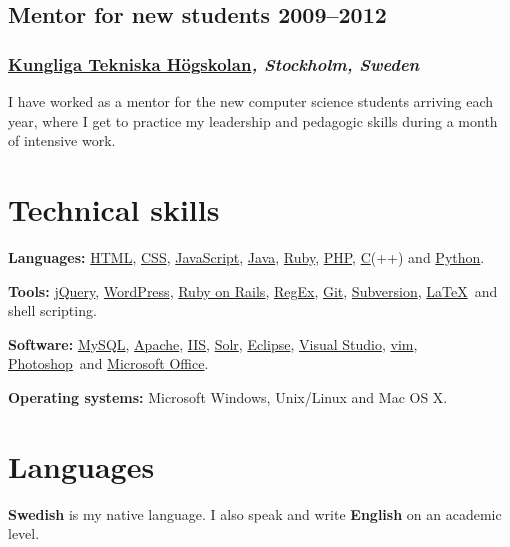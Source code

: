 \documentclass[a4paper,11pt]{article}
\newcommand{\thework}[2]{
  \subsection*{\textbf{#1} \hfill \textbf{#2}}\par%
}
\newcommand{\theplace}[2][]{%
  \subsubsection*{\textbf{#2}\textsl{#1}}%
}
\newcommand{\runin}[1]{%
  \vspace{2mm}
  \hspace{0mm}%
  {\normalsize \bfseries #1}%
}
\def\html{\href{http://en.wikipedia.org/wiki/HTML}{HTML}}
\def\javascript{\href{http://en.wikipedia.org/wiki/JavaScript}{JavaScript}}
\def\css{\href{http://en.wikipedia.org/wiki/Cascading_Style_Sheets}{CSS}}
\def\clang{\href{http://en.wikipedia.org/wiki/C_\%28programming_language\%29}{C}}
\def\regex{\href{http://en.wikipedia.org/wiki/Regular_expressions}{RegEx}}
\def\git{\href{http://git-scm.com/}{Git}}
\def\svn{\href{http://subversion.apache.org/}{Subversion}}
\def\jquery{\href{http://jquery.com/}{jQuery}}
\def\wordpress{\href{http://wordpress.org}{WordPress}}
\def\ror{\href{http://rubyonrails.org}{Ruby on Rails}}
\def\java{\href{http://www.java.com/}{Java}}
\def\php{\href{http://php.net}{PHP}}
\def\ruby{\href{http://www.ruby-lang.org/}{Ruby}}
\def\python{\href{http://www.python.org/}{Python}}
\def\mysql{\href{http://www.mysql.com/}{MySQL}}
\def\apache{\href{http://httpd.apache.org/}{Apache}}
\def\iis{\href{http://www.iis.net/}{IIS}}
\def\solr{\href{http://lucene.apache.org/solr/}{Solr}}
\def\eclipse{\href{http://www.eclipse.org/eclipse/}{Eclipse}}
\def\vs{\href{http://www.microsoft.com/visualstudio/}{Visual Studio}}
\def\vim{\href{http://www.vim.org/}{vim}}
\def\photoshop{\href{http://www.adobe.com/products/photoshop.html}{Photoshop}}
\def\office{\href{http://office.microsoft.com/}{Microsoft Office}}
\def\latex{\href{http://en.wikipedia.org/wiki/LaTeX}{LaTeX}}
\begin{document}
\thework{Mentor for new students}{2009--2012}
\theplace[, Stockholm, Sweden]{\href{http://kth.se}{Kungliga Tekniska Högskolan}}
I have worked as a mentor for the new computer science students arriving each year, where I get to practice my leadership and pedagogic skills during a month of intensive work.

\section*{Technical skills}%
\vspace{-2mm}

\runin{Languages:} \html, \css, \javascript, \java, \ruby, \php, \clang(++) and \python.

\runin{Tools:} \jquery, \wordpress, \ror, \regex, \git, \svn, \latex\ and shell scripting.

\runin{Software:} \mysql, \apache, \iis, \solr, \eclipse, \vs, \vim, \photoshop\ and \office.

\runin{Operating systems:} Microsoft Windows, Unix/Linux and Mac OS X.

\section*{Languages}%
\textbf{Swedish} is my native language. I also speak and write \textbf{English} on an academic level.
\end{document}
